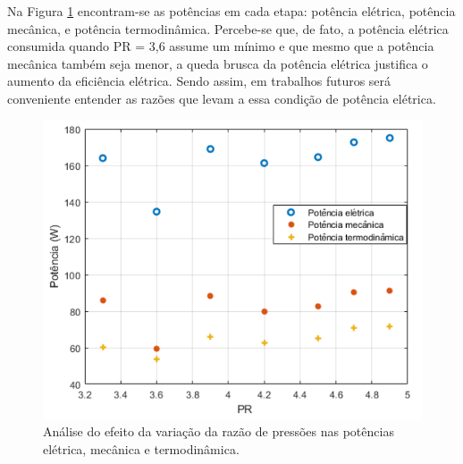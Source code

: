Na Figura \ref{fig:comp_PR_pot} encontram-se as potências em cada etapa: potência elétrica, potência mecânica, e potência termodinâmica. Percebe-se que, de fato, a potência elétrica consumida quando PR = 3,6 assume um mínimo e que mesmo que a potência mecânica também seja menor, a queda brusca da potência elétrica justifica o aumento da eficiência elétrica. Sendo assim, em trabalhos futuros será conveniente entender as razões que levam a essa condição de potência elétrica. 

 \begin{figure}[htb]
	\caption{\label{fig:comp_PR_pot}Análise do efeito da variação da razão de pressões nas potências elétrica, mecânica e termodinâmica.}
	\begin{center}
		\includegraphics[scale=0.50]{images/pote.png}
	\end{center}
\end{figure}

\nocite{anuario}
\nocite{bijanzada}
\nocite{bijanzadb}
\nocite{bradshaw}
\nocite{coolprop}
\nocite{coulomb}
\nocite{liang}
\nocite{oliveira}
\nocite{ono}
\nocite{pdsim}
\nocite{rao}
\nocite{refrigeration-ademe}
\nocite{silva}
\nocite{webplot}
\nocite{zhanga}
\nocite{zhangb}
